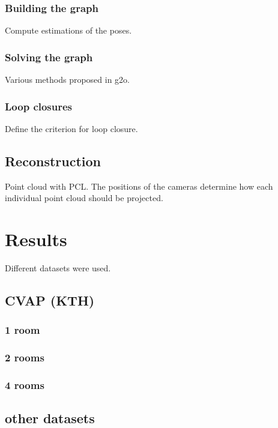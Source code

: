 \documentclass[a4paper,11pt]{kth-mag}
\begin{document}
\subsection{Building the graph}

Compute estimations of the poses.

\subsection{Solving the graph}

Various methods proposed in g2o.

\subsection{Loop closures}

Define the criterion for loop closure.


\section{Reconstruction}

Point cloud with PCL. The positions of the cameras determine how each individual point cloud should be projected.

\chapter{Results}

Different datasets were used.

\section{CVAP (KTH)}

\subsection{1 room}
\subsection{2 rooms}
\subsection{4 rooms}

\section{other datasets}
\end{document}
